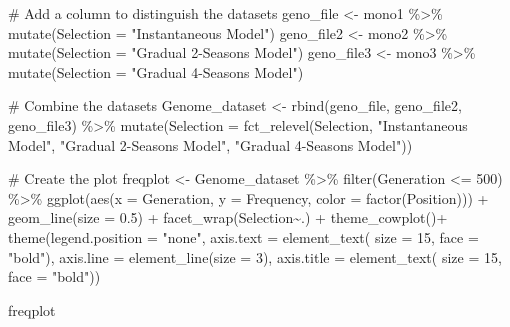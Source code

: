 \documentclass[
  letterpaper,
  DIV=11,
  numbers=noendperiod]{scrartcl}
\newenvironment{Shaded}{\begin{snugshade}}{\end{snugshade}}
\newcommand{\AttributeTok}[1]{\textcolor[rgb]{0.40,0.46,0.14}{#1}}
\newcommand{\CommentTok}[1]{\textcolor[rgb]{0.37,0.37,0.37}{#1}}
\newcommand{\DecValTok}[1]{\textcolor[rgb]{0.68,0.00,0.00}{#1}}
\newcommand{\FloatTok}[1]{\textcolor[rgb]{0.68,0.00,0.00}{#1}}
\newcommand{\FunctionTok}[1]{\textcolor[rgb]{0.28,0.35,0.67}{#1}}
\newcommand{\NormalTok}[1]{\textcolor[rgb]{0.00,0.46,0.62}{#1}}
\newcommand{\OtherTok}[1]{\textcolor[rgb]{0.00,0.46,0.62}{#1}}
\newcommand{\SpecialCharTok}[1]{\textcolor[rgb]{0.37,0.37,0.37}{#1}}
\newcommand{\StringTok}[1]{\textcolor[rgb]{0.13,0.47,0.30}{#1}}
\begin{document}
\begin{Shaded}
\begin{Highlighting}[]
\CommentTok{\# Add a column to distinguish the datasets}
\NormalTok{geno\_file }\OtherTok{\textless{}{-}}\NormalTok{ mono1 }\SpecialCharTok{\%\textgreater{}\%} \FunctionTok{mutate}\NormalTok{(}\AttributeTok{Selection =} \StringTok{"Instantaneous Model"}\NormalTok{)}
\NormalTok{geno\_file2 }\OtherTok{\textless{}{-}}\NormalTok{ mono2 }\SpecialCharTok{\%\textgreater{}\%} \FunctionTok{mutate}\NormalTok{(}\AttributeTok{Selection =} \StringTok{"Gradual 2{-}Seasons Model"}\NormalTok{)}
\NormalTok{geno\_file3 }\OtherTok{\textless{}{-}}\NormalTok{ mono3 }\SpecialCharTok{\%\textgreater{}\%} \FunctionTok{mutate}\NormalTok{(}\AttributeTok{Selection =} \StringTok{"Gradual 4{-}Seasons Model"}\NormalTok{)}

\CommentTok{\# Combine the datasets}
\NormalTok{Genome\_dataset }\OtherTok{\textless{}{-}} \FunctionTok{rbind}\NormalTok{(geno\_file, }
\NormalTok{                        geno\_file2, geno\_file3) }\SpecialCharTok{\%\textgreater{}\%} 
  \FunctionTok{mutate}\NormalTok{(}\AttributeTok{Selection =} \FunctionTok{fct\_relevel}\NormalTok{(Selection, }
                                 \StringTok{"Instantaneous Model"}\NormalTok{, }
                                 \StringTok{"Gradual 2{-}Seasons Model"}\NormalTok{, }
                                 \StringTok{"Gradual 4{-}Seasons Model"}\NormalTok{))}

\CommentTok{\# Create the plot}
\NormalTok{freqplot }\OtherTok{\textless{}{-}}\NormalTok{ Genome\_dataset }\SpecialCharTok{\%\textgreater{}\%} 
  \FunctionTok{filter}\NormalTok{(Generation }\SpecialCharTok{\textless{}=} \DecValTok{500}\NormalTok{) }\SpecialCharTok{\%\textgreater{}\%} 
  \FunctionTok{ggplot}\NormalTok{(}\FunctionTok{aes}\NormalTok{(}\AttributeTok{x =}\NormalTok{ Generation, }\AttributeTok{y =}\NormalTok{ Frequency, }\AttributeTok{color =} \FunctionTok{factor}\NormalTok{(Position))) }\SpecialCharTok{+}
  \FunctionTok{geom\_line}\NormalTok{(}\AttributeTok{size =} \FloatTok{0.5}\NormalTok{) }\SpecialCharTok{+}
  \FunctionTok{facet\_wrap}\NormalTok{(Selection}\SpecialCharTok{\textasciitilde{}}\NormalTok{.) }\SpecialCharTok{+}
  \FunctionTok{theme\_cowplot}\NormalTok{()}\SpecialCharTok{+}
  \FunctionTok{theme}\NormalTok{(}\AttributeTok{legend.position =} \StringTok{"none"}\NormalTok{,}
        \AttributeTok{axis.text =} \FunctionTok{element\_text}\NormalTok{( }\AttributeTok{size =} \DecValTok{15}\NormalTok{, }\AttributeTok{face =} \StringTok{"bold"}\NormalTok{),}
        \AttributeTok{axis.line =} \FunctionTok{element\_line}\NormalTok{(}\AttributeTok{size =} \DecValTok{3}\NormalTok{),}
        \AttributeTok{axis.title =} \FunctionTok{element\_text}\NormalTok{( }\AttributeTok{size =} \DecValTok{15}\NormalTok{, }\AttributeTok{face =} \StringTok{"bold"}\NormalTok{))}

\NormalTok{freqplot}
\end{Highlighting}
\end{Shaded}
\end{document}
